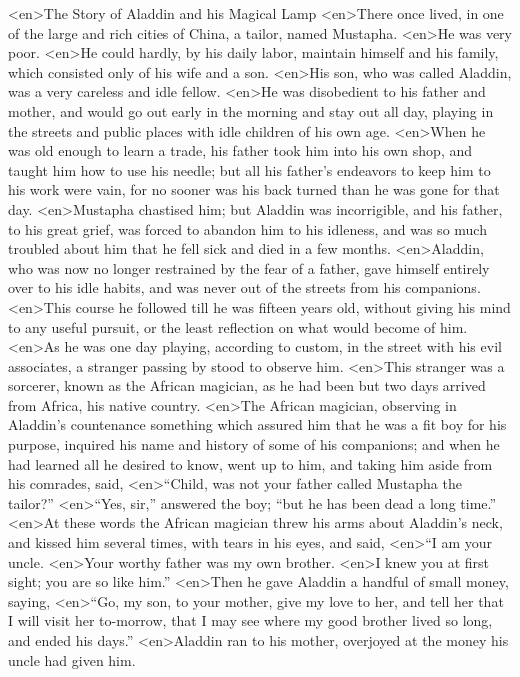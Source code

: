 <en>The Story of Aladdin and his Magical Lamp
<en>There once lived, in one of the large and rich cities of China, a tailor, named Mustapha.
<en>He was very poor.
<en>He could hardly, by his daily labor, maintain himself and his family, which consisted only of his wife and a son.
<en>His son, who was called Aladdin, was a very careless and idle fellow.
<en>He was disobedient to his father and mother, and would go out early in the morning and stay out all day, playing in the streets and public places with idle children of his own age.
<en>When he was old enough to learn a trade, his father took him into his own shop, and taught him how to use his needle; but all his father’s endeavors to keep him to his work were vain, for no sooner was his back turned than he was gone for that day.
<en>Mustapha chastised him; but Aladdin was incorrigible, and his father, to his great grief, was forced to abandon him to his idleness, and was so much troubled about him that he fell sick and died in a few months.
<en>Aladdin, who was now no longer restrained by the fear of a father, gave himself entirely over to his idle habits, and was never out of the streets from his companions.
<en>This course he followed till he was fifteen years old, without giving his mind to any useful pursuit, or the least reflection on what would become of him.
<en>As he was one day playing, according to custom, in the street with his evil associates, a stranger passing by stood to observe him.
<en>This stranger was a sorcerer, known as the African magician, as he had been but two days arrived from Africa, his native country.
<en>The African magician, observing in Aladdin’s countenance something which assured him that he was a fit boy for his purpose, inquired his name and history of some of his companions; and when he had learned all he desired to know, went up to him, and taking him aside from his comrades, said, 
<en>“Child, was not your father called Mustapha the tailor?”
<en>“Yes, sir,” answered the boy; “but he has been dead a long time.”
<en>At these words the African magician threw his arms about Aladdin’s neck, and kissed him several times, with tears in his eyes, and said, 
<en>“I am your uncle.
<en>Your worthy father was my own brother.
<en>I knew you at first sight; you are so like him.” 
<en>Then he gave Aladdin a handful of small money, saying, 
<en>“Go, my son, to your mother, give my love to her, and tell her that I will visit her to-morrow, that I may see where my good brother lived so long, and ended his days.”
<en>Aladdin ran to his mother, overjoyed at the money his uncle had given him.
